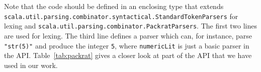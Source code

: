\noindent
Note that the code should be defined in an enclosing type that extends
\lstinline{scala.util.parsing.combinator.syntactical.StandardTokenParsers}
for lexing and
\lstinline{scala.util.parsing.combinator.PackratParsers}.
The first two lines are used for lexing. The third line defines a
parser which can, for instance, parse \lstinline{"str(5)"} and produce
the integer \lstinline{5}, where \lstinline{numericLit} is just a basic parser
in the API. Table~\ref{tab:packrat} gives a closer look at part of the API that 
we have used in our work.

